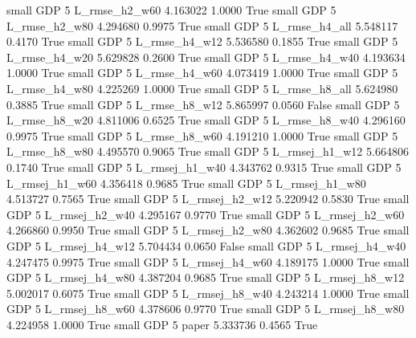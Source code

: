      small      GDP                 5  L_rmse_h2_w60   4.163022      1.0000    True
     small      GDP                 5  L_rmse_h2_w80   4.294680      0.9975    True
     small      GDP                 5  L_rmse_h4_all   5.548117      0.4170    True
     small      GDP                 5  L_rmse_h4_w12   5.536580      0.1855    True
     small      GDP                 5  L_rmse_h4_w20   5.629828      0.2600    True
     small      GDP                 5  L_rmse_h4_w40   4.193634      1.0000    True
     small      GDP                 5  L_rmse_h4_w60   4.073419      1.0000    True
     small      GDP                 5  L_rmse_h4_w80   4.225269      1.0000    True
     small      GDP                 5  L_rmse_h8_all   5.624980      0.3885    True
     small      GDP                 5  L_rmse_h8_w12   5.865997      0.0560   False
     small      GDP                 5  L_rmse_h8_w20   4.811006      0.6525    True
     small      GDP                 5  L_rmse_h8_w40   4.296160      0.9975    True
     small      GDP                 5  L_rmse_h8_w60   4.191210      1.0000    True
     small      GDP                 5  L_rmse_h8_w80   4.495570      0.9065    True
     small      GDP                 5 L_rmsej_h1_w12   5.664806      0.1740    True
     small      GDP                 5 L_rmsej_h1_w40   4.343762      0.9315    True
     small      GDP                 5 L_rmsej_h1_w60   4.356418      0.9685    True
     small      GDP                 5 L_rmsej_h1_w80   4.513727      0.7565    True
     small      GDP                 5 L_rmsej_h2_w12   5.220942      0.5830    True
     small      GDP                 5 L_rmsej_h2_w40   4.295167      0.9770    True
     small      GDP                 5 L_rmsej_h2_w60   4.266860      0.9950    True
     small      GDP                 5 L_rmsej_h2_w80   4.362602      0.9685    True
     small      GDP                 5 L_rmsej_h4_w12   5.704434      0.0650   False
     small      GDP                 5 L_rmsej_h4_w40   4.247475      0.9975    True
     small      GDP                 5 L_rmsej_h4_w60   4.189175      1.0000    True
     small      GDP                 5 L_rmsej_h4_w80   4.387204      0.9685    True
     small      GDP                 5 L_rmsej_h8_w12   5.002017      0.6075    True
     small      GDP                 5 L_rmsej_h8_w40   4.243214      1.0000    True
     small      GDP                 5 L_rmsej_h8_w60   4.378606      0.9770    True
     small      GDP                 5 L_rmsej_h8_w80   4.224958      1.0000    True
     small      GDP                 5          paper   5.333736      0.4565    True
